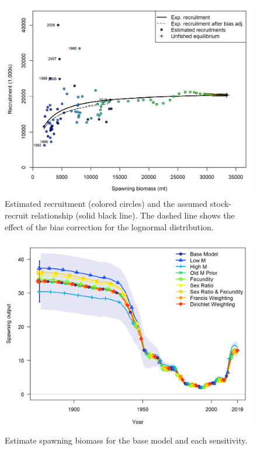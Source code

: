\documentclass[12pt,]{article}
\begin{document}
\FloatBarrier

\begin{figure}
\centering
\includegraphics{r4ss/plots_mod1/SR_curve2.png}
\caption{Estimated recruitment (colored circles) and the assumed
stock-recruit relationship (solid black line). The dashed line shows the
effect of the bias correction for the lognormal distribution.
\label{fig:stock_recruit_curve}}
\end{figure}

\FloatBarrier

\begin{figure}
\centering
\includegraphics{Figures/ssb_sens.png}
\caption{Estimate spawning biomass for the base model and each
sensitivity. \label{fig:sens_ssb}}
\end{figure}
\end{document}
